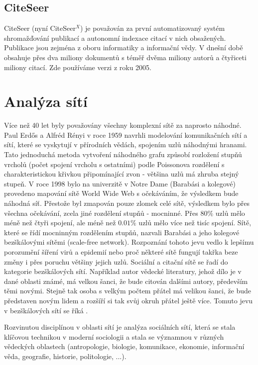 \documentclass{bakalarka}
\begin{document}
\subsection{CiteSeer}
CiteSeer (nyní CiteSeer$^X$) \cite{citeseer} je považován za první
automatizovaný systém shromažďování publikací a autonomní indexace citací v
nich obsažených. Publikace jsou zejména z oboru informatiky a informační vědy.
V dnešní době obsahuje přes dva miliony dokumentů s téměř dvěma miliony autorů
a čtyřiceti miliony citací. Zde používáme verzi z roku 2005.




\section{Analýza sítí}
Více než 40 let byly považovány všechny komplexní sítě za naprosto náhodné.
Paul Erdős a Alfréd Rényi v roce 1959 navrhli modelování komunikačních sítí a
sítí, které se vyskytují v přírodních vědách, spojením uzlů náhodnými hranami.
Tato jednoduchá metoda vytvoření náhodného grafu způsobí rozložení stupňů
vrcholů (počet spojení vrcholu s ostatními) podle Poissonova rozdělení s
charakteristickou křivkou připomínající zvon - většina uzlů má zhruba stejný
stupeň. 
V roce 1998 bylo na univerzitě v Notre Dame (Barabási a kolegové) provedeno
mapování sítě World Wide Web s očekáváním, že výsledkem bude náhodná síť.
Přestože byl zmapován pouze zlomek celé sítě, výsledkem bylo přes všechna
očekávání, zcela jiné rozdělení stupňů - mocninné. Přes $80\%$ uzlů mělo méně
než čtyři spojení, ale méně než $0.01\%$ uzlů mělo více než tisíc spojení.
Sítě, které se řídí mocninným rozdělením stupňů, nazvali Barabási a jeho kolegové
bezškálovými sítěmi (scale-free network). Rozpoznání tohoto jevu vedlo k
lepšímu porozumění šíření virů a epidemií nebo proč některé sítě fungují takřka
beze změny i přes poruchu většiny jejich uzlů.  Sociální a citační sítě se řadí
do kategorie bezškálových sítí. Například autor vědecké literatury, jehož dílo
je v dané oblasti známé, má velkou šanci, že bude citován dalšími autory,
především těmi novými. Stejně tak osoba s velkým počtem přátel má velikou
šanci, že bude představen novým lidem a rozšíří si tak svůj okruh přátel ještě
více. Tomuto jevu v bezškálových sítí se říká .

Rozvinutou disciplínou v oblasti sítí je analýza sociálních sítí, která se
stala klíčovou technikou v moderní sociologii a stala se významnou v různých
vědeckých oblastech (antropologie, biologie, komunikace, ekonomie, informační
věda, geografie, historie, politologie, ...).
\end{document}
